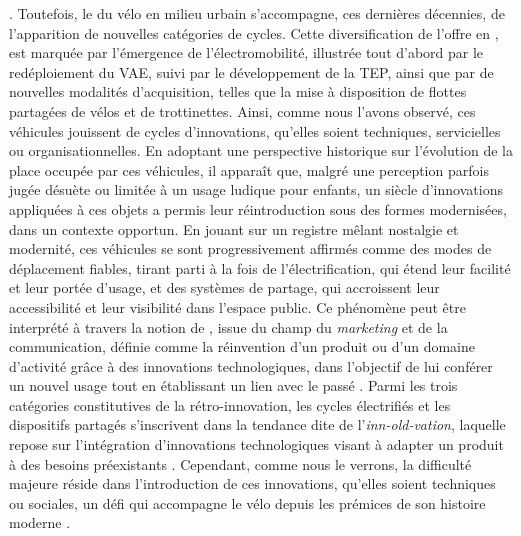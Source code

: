 \begin{refsegment}
{}. Toutefois, le  du vélo en milieu urbain s’accompagne, ces dernières décennies, de l’apparition de nouvelles catégories de cycles. Cette diversification de l'offre en  \textcolor{blue}{\autocite[91-92]{vincent-geslin__2012}}, est marquée par l’émergence de l’électromobilité, illustrée tout d’abord par le redéploiement du \acrshort{VAE}, suivi par le développement de la \acrshort{TEP}, ainsi que par de nouvelles modalités d’acquisition, telles que la mise à disposition de flottes partagées de vélos et de trottinettes. Ainsi, comme nous l’avons observé, ces véhicules jouissent de cycles d’innovations, qu’elles soient techniques, servicielles ou organisationnelles. En adoptant une perspective historique sur l’évolution de la place occupée par ces véhicules, il apparaît que, malgré une perception parfois jugée désuète ou limitée à un usage ludique pour enfants, un siècle d’innovations appliquées à ces objets a permis leur réintroduction sous des formes modernisées, dans un contexte opportun. En jouant sur un registre mêlant nostalgie et modernité, ces véhicules se sont progressivement affirmés comme des modes de déplacement fiables, tirant parti à la fois de l’électrification, qui étend leur facilité et leur portée d’usage, et des systèmes de partage, qui accroissent leur accessibilité et leur visibilité dans l’espace public. Ce phénomène peut être interprété à travers la notion de , issue du champ du \textsl{marketing} et de la communication, définie comme la réinvention d’un produit ou d’un domaine d’activité grâce à des innovations technologiques, dans l’objectif de lui conférer un nouvel usage tout en établissant un lien avec le passé \textcolor{blue}{\autocite{barthelot_retro-innovation_2018}}. Parmi les trois catégories constitutives de la rétro-innovation, les cycles électrifiés et les dispositifs partagés s’inscrivent dans la tendance dite de l’\textsl{inn-old-vation}, laquelle repose sur l’intégration d’innovations technologiques visant à adapter un produit à des besoins préexistants \textcolor{blue}{\autocite{lamy_retro-innovation_2016}}. Cependant, comme nous le verrons, la difficulté majeure réside dans l’introduction de ces innovations, qu’elles soient techniques ou sociales, un défi qui accompagne le vélo depuis les prémices de son histoire moderne \textcolor{blue}{\autocite[33]{jouenne_quest-ce_2022}}.%


\end{refsegment}
